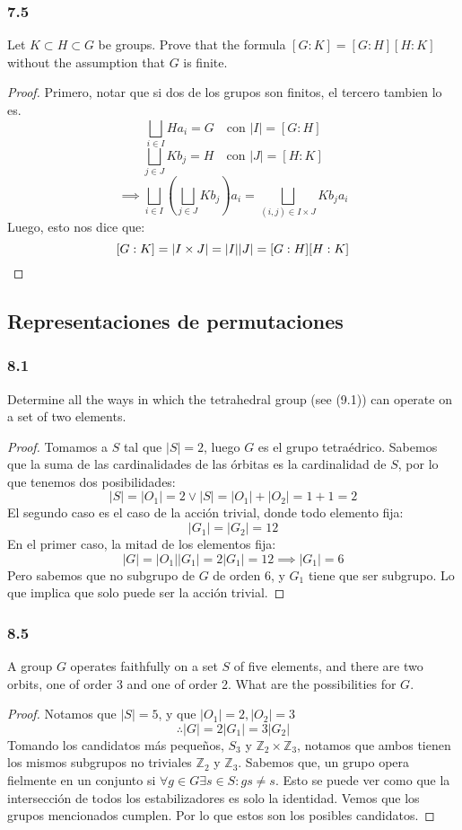 \documentclass[11pt]{article}
\newcommand{\set}[1]{\mathbb{#1}}
\theoremstyle{definition}
\begin{document}
\subsubsection{7.5}
Let $K\subset H\subset G$ be groups. Prove that the formula $[G:K]=[G:H][H:K]$ without the assumption that $G$ is finite.
\begin{proof}
    Primero, notar que si dos de los grupos son finitos, el tercero tambien lo es.
    \[\bigsqcup_{i\in I}Ha_i=G\quad\textrm{con }|I|=[G:H]\]
    \[\bigsqcup_{j\in J}Kb_j=H\quad\textrm{con }|J|=[H:K]\]
    \[\implies\bigsqcup_{i\in I}\left(\bigsqcup_{j\in J}Kb_j\right)a_i=\bigsqcup_{(i,j)\in I\times J}Kb_ja_i\]
    Luego, esto nos dice que:
    \[[G:K]=|I\times J|=|I||J|=[G:H][H:K]\qedhere\]
\end{proof}
\subsection{Representaciones de permutaciones}
\subsubsection{8.1}
Determine all the ways in which the tetrahedral group (see (9.1)) can operate on a set of two elements.
\begin{proof}
    Tomamos a $S$ tal que $|S|=2$, luego $G$ es el grupo tetraédrico. Sabemos que la suma de las cardinalidades de las órbitas es la cardinalidad de $S$, por lo que tenemos dos posibilidades:
    \[|S|=|O_1|=2\vee|S|=|O_1|+|O_2|=1+1=2\]
    El segundo caso es el caso de la acción trivial, donde todo elemento fija:
    \[|G_1|=|G_2|=12\]
    En el primer caso, la mitad de los elementos fija:
    \[|G|=|O_1||G_1|=2|G_1|=12\implies |G_1|=6\]
    Pero sabemos que no subgrupo de $G$ de orden 6, y $G_1$ tiene que ser subgrupo. Lo que implica que solo puede ser la acción trivial.
\end{proof}
\subsubsection{8.5}
A group $G$ operates faithfully on a set $S$ of five elements, and there are two orbits, one of order 3 and one of order 2. What are the possibilities for $G$.
\begin{proof}
    Notamos que $|S|=5$, y que $|O_1|=2, |O_2|=3$
    \[\therefore |G|=2|G_1|=3|G_2|\]
    Tomando los candidatos más pequeños, $S_3$ y $\set{Z}_2\times\set{Z}_3$, notamos que ambos tienen los mismos subgrupos no triviales $\set{Z}_2$ y $\set{Z}_3$. Sabemos que, un grupo opera fielmente en un conjunto si $\forall g\in G\exists s\in S: gs\neq s$. Esto se puede ver como que la intersección de todos los estabilizadores es solo la identidad. Vemos que los grupos mencionados cumplen. Por lo que estos son los posibles candidatos.
\end{proof}
\end{document}
